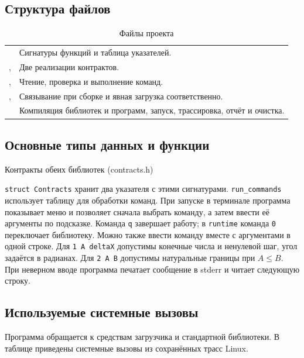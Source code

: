 \documentclass[12pt,a4paper]{article}
\begin{document}
\subsection{Структура файлов}
\begin{table}[H]
\caption{Файлы проекта}
\begin{tabularx}{\linewidth}{|P{5cm}|L|}
\hline
{} &  \\ \hline
{} & Сигнатуры функций и таблица указателей. \\ \hline
{},  & Две реализации контрактов. \\ \hline
{},  & Чтение, проверка и выполнение команд. \\ \hline
{},  & Связывание при сборке и явная загрузка соответственно. \\ \hline
{} & Компиляция библиотек и программ, запуск, трассировка, отчёт и очистка. \\ \hline
\end{tabularx}
\end{table}

\subsection{Основные типы данных и функции}
\begin{listingblock}{Контракты обеих библиотек (contracts.h)}
\end{listingblock}
\texttt{struct Contracts} хранит два указателя с этими сигнатурами. \texttt{run\_commands} использует таблицу для обработки команд. При запуске в терминале программа показывает меню и позволяет сначала выбрать команду, а затем ввести её аргументы по подсказке. Команда \texttt{q} завершает работу; в \texttt{runtime} команда \texttt{0} переключает библиотеку. Можно также ввести команду вместе с аргументами в одной строке. Для \texttt{1 A deltaX} допустимы конечные числа и ненулевой шаг, угол задаётся в радианах. Для \texttt{2 A B} допустимы натуральные границы при $A\leq B$. При неверном вводе программа печатает сообщение в stderr и читает следующую строку.

\subsection{Используемые системные вызовы}
Программа обращается к средствам загрузчика и стандартной библиотеки. В таблице приведены системные вызовы из сохранённых трасс Linux.
\end{document}
